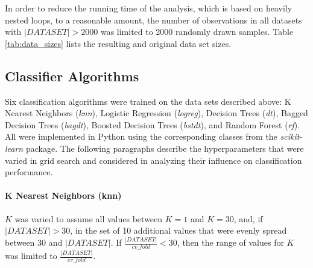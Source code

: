 \documentclass[twoside,11pt]{article}
\begin{document}
			\vspace{1em}
			
			In order to reduce the running time of the analysis, which is based on heavily nested loops, to a reasonable amount, the number of observations in all datasets with $|DATASET| > 2000$ was limited to 2000 randomly drawn samples. Table \ref{tab:data_sizes} lists the resulting and original data set sizes.
			
			\begin{table}
			\end{table}
	
		\subsection{Classifier Algorithms}
			\label{sec:clf_hyperparams}
			Six classification algorithms were trained on the data sets described above: K Nearest Neighbors (\textit{knn}), Logistic Regression (\textit{logreg}), Decision Trees (\textit{dt}), Bagged Decision Trees (\textit{bagdt}), Boosted Decision Trees (\textit{bstdt}), and Random Forest (\textit{rf}). All were implemented in Python using the corresponding classes from the \textit{scikit-learn} package. The following paragraphs describe the hyperparameters that were varied in grid search and considered in analyzing their influence on classification performance.
			
			\paragraph{K Nearest Neighbors (knn)}
			$K$ was varied to assume all values between $K=1$ and $K=30$, and, if $|DATASET|>30$, in the set of 10 additional values that were evenly spread between 30 and $|DATASET|$. If $\frac{|DATASET|}{cv\_fold} < 30$, then the range of values for $K$ was limited to $\frac{|DATASET|}{cv\_fold}$.
			
\end{document}
